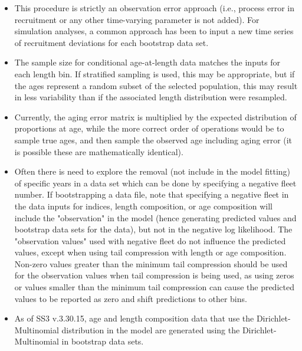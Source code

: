 \begin{itemize}

	\item This procedure is strictly an observation error approach (i.e., process error in recruitment or any other time-varying parameter is not added). For simulation analyses, a common approach has been to input a new time series of recruitment deviations for each bootstrap data set.
	
	\item The sample size for conditional age-at-length data matches the inputs for each length bin. If stratified sampling is used, this may be appropriate, but if the ages represent a random subset of the selected population, this may result in less variability than if the associated length distribution were resampled.
	
	\item Currently, the aging error matrix is multiplied by the expected distribution of proportions at age, while the more correct order of operations would be to sample true ages, and then sample the observed age including aging error (it is possible these are mathematically identical).
	
	\item Often there is need to explore the removal (not include in the model fitting) of specific years in a data set which can be done by specifying a negative fleet number. If bootstrapping a data file, note that specifying a negative fleet in the data inputs for indices, length composition, or age composition will include the "observation" in the model (hence generating predicted values and bootstrap data sets for the data), but not in the negative log likelihood. The "observation values" used with negative fleet do not influence the predicted values, except when using tail compression with length or age composition. Non-zero values greater than the minimum tail compression should be used for the observation values when tail compression is being used, as using zeros or values smaller than the minimum tail compression can cause the predicted values to be reported as zero and shift predictions to other bins.
	
	\item As of SS3 v.3.30.15, age and length composition data that use the Dirichlet-Multinomial distribution in the model are generated using the Dirichlet-Multinomial in bootstrap data sets.
	
\end{itemize}

